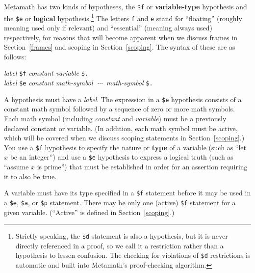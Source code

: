 Metamath has two kinds of hypo\-theses, the \texttt{\$f} or {\bf variable-type} hypothesis and the \texttt{\$e} or {\bf logical}
hypo\-the\-sis.\footnote{Strictly speaking, the
\texttt{\$d} statement is also a hypothesis, but it is never directly referenced
in a proof, so we call it a restriction rather than a hypothesis to lessen
confusion.  The checking for violations of \texttt{\$d} restrictions is automatic
and built into Metamath's proof-checking algorithm.} The letters \texttt{f} and
\texttt{e} stand for ``floating'' (roughly meaning
used only if relevant) and ``essential'' (meaning
always used) respectively, for reasons that will become apparent
when we discuss frames in
Section~\ref{frames} and scoping in Section~\ref{scoping}. The syntax of these
are as follows:
\begin{center}
  {\em label} \texttt{\$f} {\em constant} {\em variable} \texttt{\$.}\\
  {\em label} \texttt{\$e} {\em constant}
      {\em math-symbol}\ \,$\cdots$\ {\em math-symbol} \texttt{\$.}\\
\end{center}
A hypothesis must have a {\em label}.  The expression in a
\texttt{\$e} hypothesis consists of a constant math symbol followed by a sequence
of zero or more math symbols. Each math symbol (including {\em constant}
and {\em variable}) must be a previously declared constant or variable.  (In
addition, each math symbol must be active, which will be covered when we
discuss scoping statements in Section~\ref{scoping}.)  You use a \texttt{\$f}
hypothesis to specify the
nature or {\bf type} of a variable (such as ``let $x$ be an
integer'') and use a \texttt{\$e} hypothesis to express a logical truth (such as
``assume $x$ is prime'') that must be established in order for an assertion
requiring it to also be true.

A variable must have its type specified in a \texttt{\$f} statement before
it may be used in a \texttt{\$e}, \texttt{\$a}, or \texttt{\$p}
statement.  There may be only one (active) \texttt{\$f} statement for a
given variable.  (``Active'' is defined in Section~\ref{scoping}.)

